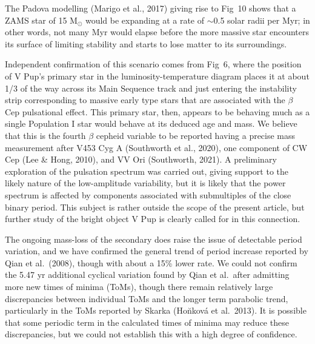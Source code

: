 \documentclass[useAMS,usenatbib]{mnras}                                                                           \usepackage[pdftex]{graphicx}
\begin{document}
{  The Padova modelling  (Marigo et al., 2017) giving rise to Fig~10 shows that 
  a ZAMS star of 15 M$_{\odot}$ would be expanding at a rate of $\sim$0.5 solar radii
  per Myr; in other words, not many Myr would elapse before the
  more massive star encounters its surface of limiting stability and
  starts to lose matter to its surroundings.  
     
  Independent confirmation  of this scenario comes from Fig~6, where the position of
  V Pup's primary star in the luminosity-temperature diagram places it 
  at about 1/3 of the way across its Main Sequence track and just entering
  the instability strip corresponding to massive early type stars that are
  associated with the $\beta$ Cep pulsational effect.
  This primary star, then, appears to be behaving much  
  as a single Population I star would behave
  at its deduced age and mass. 
  We  believe that this is the fourth $\beta$ cepheid variable to be reported
  having a precise mass measurement
  after V453 Cyg A (Southworth et al., 2020), %
  one component of CW Cep  (Lee \& Hong, 2010), %
   and VV Ori (Southworth, 2021). %
  A preliminary exploration of the pulsation spectrum was carried out,
  giving support to the likely nature of the low-amplitude variability,
  but it is likely that the power spectrum is affected by components
  associated with submultiples of the close binary period.  This subject
  is rather outside the scope of the present article, but
  further study of the bright object V Pup is clearly called for in this connection.}
  
  The ongoing mass-loss of the secondary does raise the issue of detectable period
  variation, and we have confirmed the general trend of period increase reported 
  by Qian et al.\ (2008), though with about a 15\% lower rate.
  We could not confirm the 5.47 yr additional cyclical variation found by Qian et al.\
  after admitting more new times of minima (ToMs),
  though there remain relatively large discrepancies between individual ToMs 
  and the longer term parabolic trend, particularly in the  ToMs
  reported by Skarka (Ho\u{n}kov\'{a} et al.\ 2013).   It is possible that some periodic term in the 
  calculated times of minima
  may  reduce these discrepancies, but we could not establish 
  this with a high  degree of confidence.
  
\end{document}
